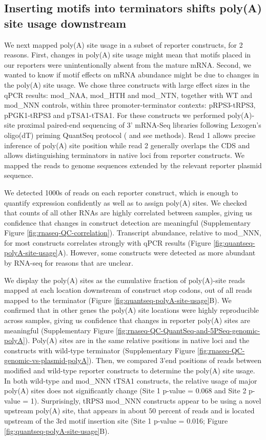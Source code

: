 \documentclass[../main.tex]{subfiles}
\begin{document}
\subsection{Inserting motifs into terminators shifts poly(A) site usage downstream}

We next mapped poly(A) site usage in a subset of reporter constructs, for 2 reasons.
First, changes in poly(A) site usage might mean that motifs placed in our reporters were unintentionally absent from the mature mRNA.
Second, we wanted to know if motif effects on mRNA abundance might be due to changes in the poly(A) site usage.
We chose three constructs with large effect sizes in the qPCR results: mod\_NAA, mod\_HTH and mod\_NTN, together with WT and mod\_NNN controls, within three promoter-terminator contexts: pRPS3-tRPS3, pPGK1-tRPS3 and pTSA1-tTSA1.
For these constructs we performed poly(A)-site proximal paired-end sequencing of 3' mRNA-Seq libraries following Lexogen's oligo(dT) priming QuantSeq protocol (\cite{Moll2014} and see methods).
Read 1 allows precise inference of poly(A) site position while read 2 generally overlaps the CDS and allows distinguishing terminators in native loci from reporter constructs.
We mapped the reads to genome sequences extended by the relevant reporter plasmid sequence.

We detected 1000s of reads on each reporter construct, which is enough to quantify expression confidently as well as to assign poly(A) sites.
We checked that counts of all other RNAs are highly correlated between samples, giving us confidence that changes in construct detection are meaningful (Supplementary Figure \ref{fig:rnaseq-QC-correlation}).
Transcript abundance, relative to mod\_NNN, for most constructs correlates strongly with qPCR results (Figure \ref{fig:quantseq-polyA-site-usage}A).
However, some constructs were detected as more abundant by RNA-seq for reasons that are unclear.

We display the poly(A) sites as the cumulative fraction of poly(A)-site reads mapped at each location downstream of construct stop codons, out of all reads mapped to the terminator (Figure \ref{fig:quantseq-polyA-site-usage}B).
We confirmed that in other genes the poly(A) site locations were highly reproducible across samples, giving us confidence that changes in reporter poly(A) sites are meaningful (Supplementary Figure \ref{fig:rnaseq-QC-QuantSeq-and-5PSeq-genomic-polyA}).
Poly(A) sites are in the same relative positions in native loci and the constructs with wild-type terminator (Supplementary Figure \ref{fig:rnaseq-QC-genomic-vs-plasmid-polyA}).
Then, we compared 3'end positions of reads between modified and wild-type reporter constructs to determine the poly(A) site usage.
In both wild-type and mod\_NNN tTSA1 constructs, the relative usage of major poly(A) sites does not significantly change (Site 1 p-value = 0.068 and Site 2 p-value = 1).
Surprisingly, tRPS3 mod\_NNN constructs appear to be using a novel upstream poly(A) site, that appears in about \(50%
\) percent of reads and is located upstream of the 3rd motif insertion site (Site 1 p-value = 0.016; Figure \ref{fig:quantseq-polyA-site-usage}B).
\end{document}
